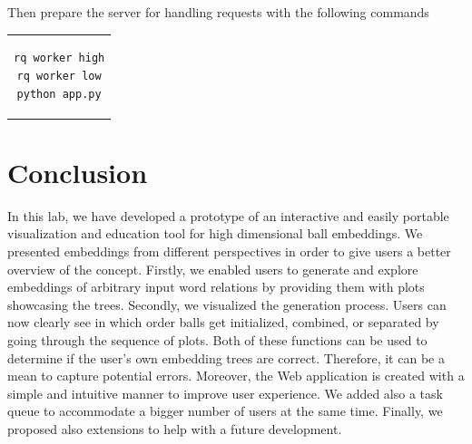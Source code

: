 \documentclass[]{article}
\begin{document}
Then prepare the server for handling requests with the following commands

\begin{center}
\begin{tabular}{c}
\begin{lstlisting}
rq worker high
rq worker low
python app.py
\end{lstlisting}
\end{tabular}
\end{center}


\section{Conclusion}
In this lab, we have developed a prototype of an interactive and easily portable visualization and education tool for high dimensional ball embeddings. We presented embeddings from different perspectives in order to give users a better overview of the concept. Firstly, we enabled users to generate and explore embeddings of arbitrary input word relations by providing them with plots showcasing the trees. Secondly, we visualized the generation process. Users can now clearly see in which order balls get initialized, combined, or separated by going through the sequence of plots. Both of these functions can be used to determine if the user's own embedding trees are correct. Therefore, it can be a mean to capture potential errors. Moreover, the Web application is created with a simple and intuitive manner to improve user experience. We added also a task queue to accommodate a bigger number of users at the same time. Finally, we proposed also extensions to help with a future development. 

	
	
	
	 
\end{document}

